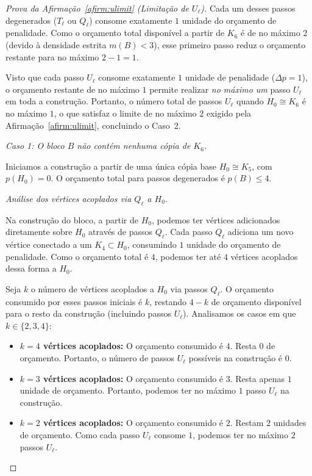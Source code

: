 \documentclass[reqno, 12pt]{amsart}
\numberwithin{equation}{section}
\theoremstyle{plain}
\theoremstyle{definition}
\newcommand{\maxdens}{m}
\begin{document}
\begin{proof}[Prova da Afirmação~\ref{afirm:ulimit} (Limitação de $U_\ell$)]
Cada um desses passos degenerados ($T_\ell$ ou $Q_\ell$) consome exatamente $1$
unidade do orçamento de penalidade. Como o orçamento total disponível a partir de
$K_6$ é de no máximo $2$ (devido à densidade estrita $\maxdens(B) < 3$), esse primeiro
passo reduz o orçamento restante para no máximo $2 - 1 = 1$.

Visto que cada passo $U_\ell$ consome exatamente $1$ unidade de penalidade ($\Delta p = 1$),
o orçamento restante de no máximo $1$ permite realizar \emph{no máximo um} passo
$U_\ell$ em toda a construção. Portanto, o número total de passos $U_\ell$ quando
$H_0 \cong K_6$ é no máximo $1$, o que satisfaz o limite de no máximo $2$ exigido
pela Afirmação~\ref{afirm:ulimit}, concluindo o Caso~2.

\medskip
\noindent\textit{Caso 1: O bloco $B$ não contém nenhuma cópia de $K_6$.}

\medskip

Iniciamos a construção a partir de uma única cópia base $H_0 \cong K_5$, com
$p(H_0) = 0$. O orçamento total para passos degenerados é $p(B) \le 4$.

\medskip
\noindent\textit{Análise dos vértices acoplados via $Q_\ell$ a $H_0$.}

Na construção do bloco, a partir de $H_0$, podemos ter vértices adicionados diretamente sobre $H_0$ através de passos $Q_\ell$. Cada passo $Q_\ell$ adiciona um novo vértice conectado a um $K_4 \subset H_0$, consumindo $1$ unidade do orçamento de penalidade. Como o orçamento total é $4$, podemos ter até $4$ vértices acoplados dessa forma a $H_0$.

Seja $k$ o número de vértices acoplados a $H_0$ via passos $Q_\ell$. O orçamento consumido por esses passos iniciais é $k$, restando $4 - k$ de orçamento disponível para o resto da construção (incluindo passos $U_\ell$). Analisamos os casos em que $k \in \{2, 3, 4\}$:

\begin{itemize}
    \item \textbf{$k = 4$ vértices acoplados:} O orçamento consumido é $4$. Resta $0$ de orçamento. Portanto, o número de passos $U_\ell$ possíveis na construção é \textbf{$0$}.
    \item \textbf{$k = 3$ vértices acoplados:} O orçamento consumido é $3$. Resta apenas $1$ unidade de orçamento. Portanto, podemos ter no máximo \textbf{$1$} passo $U_\ell$ na construção.
    \item \textbf{$k = 2$ vértices acoplados:} O orçamento consumido é $2$. Restam $2$ unidades de orçamento. Como cada passo $U_\ell$ consome $1$, podemos ter no máximo \textbf{$2$} passos $U_\ell$.
\end{itemize}


\end{proof}
\end{document}

